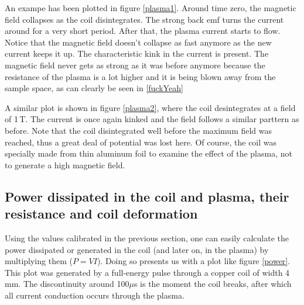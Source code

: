 An exampe has been plotted in figure \ref{plasma1}. Around time zero, the 
magnetic field collapses as the coil disintegrates. The strong back emf 
turns the current around for a very short period. After that, the plasma 
current starts to flow. Notice that the magnetic field doesn't collapse as fast 
anymore as the new current keeps it up. The characteristic kink in the current 
is present. The magnetic field never gets as strong as it was before anymore 
because the resistance of the plasma is a lot higher and it is being blown away 
from the sample space, as can clearly be seen in \ref{fuckYeah}



A similar plot is shown in figure \ref{plasma2}, where the coil 
desintegrates at a field of 1\,T. The current is once again kinked and the 
field follows a similar parttern as before. Note that the coil 
disintegrated well before the maximum field was reached, thus a great deal 
of potential was lost here. Of course, the coil was specially made from 
thin aluminum foil to examine the effect of the plasma, not to generate a 
high magnetic field.



\subsection{Power dissipated in the coil and plasma, their resistance and coil 
deformation}

Using the values calibrated in the previous section, one can easily 
calculate the power dissipated or generated in the coil (and later on, in 
the plasma) by multiplying them ($P = VI$).  Doing so presents us with a 
plot like figure \ref{power}. This plot was generated by a full-energy 
pulse through a copper coil of width 4\,mm. The discontinuity around 
100$\mu$s is the moment the coil breaks, after which all current conduction 
occurs through the plasma.

